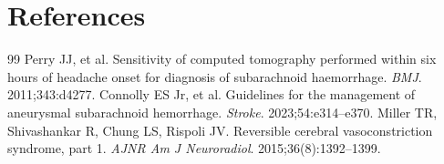 \section*{References}
\begin{thebibliography}{99}
 Perry JJ, et al. Sensitivity of computed tomography performed within six hours of headache onset for diagnosis of subarachnoid haemorrhage. \textit{BMJ}. 2011;343:d4277.
 Connolly ES Jr, et al. Guidelines for the management of aneurysmal subarachnoid hemorrhage. \textit{Stroke}. 2023;54:e314--e370.
 Miller TR, Shivashankar R, Chung LS, Rispoli JV. Reversible cerebral vasoconstriction syndrome, part 1. \textit{AJNR Am J Neuroradiol}. 2015;36(8):1392--1399.
\end{thebibliography}
